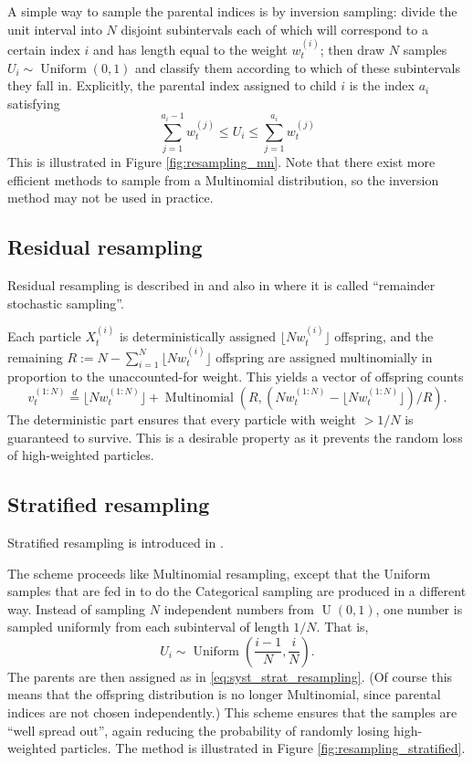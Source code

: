 \documentclass[fleqn]{article}
\theoremstyle{definition}
\newcommand{\eqdist}{\overset{d}{=}}
\newcommand{\Unif}{\operatorname{Uniform}}
\newcommand{\vt}[2][t]{v_{#1}^{(#2)}}
\newcommand{\wt}[2][t]{w_{#1}^{(#2)}}
\begin{document}
A simple way to sample the parental indices is by inversion sampling: divide the unit interval into $N$ disjoint subintervals each of which will correspond to a certain index $i$ and has length equal to the weight $\wt{i}$; then draw $N$ samples $U_i \sim \Unif(0,1)$ and classify them according to which of these subintervals they fall in.
Explicitly, the parental index assigned to child $i$ is the index $a_i$ satisfying
\begin{equation}\label{eq:syst_strat_resampling}
\sum_{j=1}^{a_i -1} \wt{j} \leq U_i \leq \sum_{j=1}^{a_i} \wt{j}
\end{equation}
This is illustrated in Figure \ref{fig:resampling_mn}. 
Note that there exist more efficient methods to sample from a Multinomial distribution, so the inversion method may not be used in practice.

\subsection{Residual resampling}
Residual resampling is described in \citet{liu1998} and also in \citet{whitley1994} where it is called ``remainder stochastic sampling''.

Each particle $X_{t}^{(i)}$ is deterministically assigned $\lfloor N \wt{i} \rfloor$ offspring, and the remaining $R := N- \sum_{i=1}^N \lfloor N w_{t}^{(i)} \rfloor$ offspring are assigned multinomially in proportion to the unaccounted-for weight. 
This yields a vector of offspring counts
\begin{equation*}
\vt{1:N} \eqdist \lfloor N \wt{1:N} \rfloor +  \operatorname{Multinomial}(R, (N \wt{1:N} - \lfloor N \wt{1:N}\rfloor)/R) .
\end{equation*}
The deterministic part ensures that every particle with weight $>1/N$ is guaranteed to survive. This is a desirable property as it prevents the random loss of high-weighted particles.

\subsection{Stratified resampling}
Stratified resampling is introduced in \cite{kitagawa1996}.

The scheme proceeds like Multinomial resampling, except that the Uniform samples that are fed in to do the Categorical sampling are produced in a different way.
Instead of sampling $N$ independent numbers from $\operatorname{U}(0,1)$, one number is sampled uniformly from each subinterval of length $1/N$. 
That is, 
\begin{equation*}
U_i \sim \Unif \left(\frac{i-1}{N}, \frac{i}{N} \right) .
\end{equation*}
The parents are then assigned as in \eqref{eq:syst_strat_resampling}.
(Of course this means that the offspring distribution is no longer Multinomial, since parental indices are not chosen independently.)
This scheme ensures that the samples are ``well spread out'', again reducing the probability of randomly losing high-weighted particles.
The method is illustrated in Figure \ref{fig:resampling_stratified}.
\end{document}
